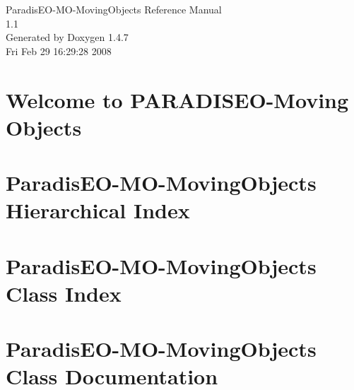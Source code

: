 \documentclass[a4paper]{book}
\begin{document}
\begin{titlepage}
\vspace*{7cm}
\begin{center}
{\Large Paradis\-EO-MO-Moving\-Objects Reference Manual\\[1ex]\large 1.1 }\\
\vspace*{1cm}
{\large Generated by Doxygen 1.4.7}\\
\vspace*{0.5cm}
{\small Fri Feb 29 16:29:28 2008}\\
\end{center}
\end{titlepage}
\clearemptydoublepage
{}
\tableofcontents
\clearemptydoublepage
{}
\chapter{Welcome to PARADISEO-Moving Objects }
\label{index}
\chapter{Paradis\-EO-MO-Moving\-Objects Hierarchical Index}

\chapter{Paradis\-EO-MO-Moving\-Objects Class Index}

\chapter{Paradis\-EO-MO-Moving\-Objects Class Documentation}




































\printindex
\end{document}
